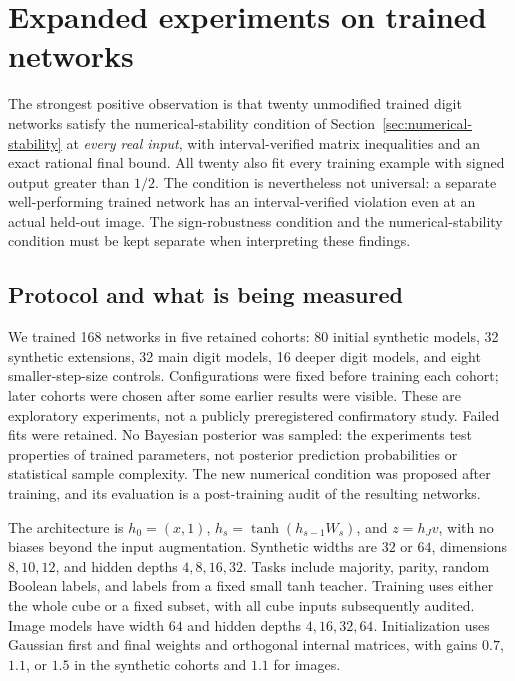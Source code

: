 \section{Expanded experiments on trained networks}
\label{sec:expanded-experiments}

The strongest positive observation is that twenty unmodified trained digit
networks satisfy the numerical-stability condition of Section~\ref{sec:numerical-stability} at \emph{every real
input}, with interval-verified matrix inequalities and an exact rational
final bound. All twenty also fit every training example with signed output
greater than $1/2$. The condition is nevertheless not universal: a separate
well-performing trained network has an interval-verified violation even
at an actual held-out image. The sign-robustness condition and the numerical-stability
condition must be kept separate when interpreting these findings.

\subsection{Protocol and what is being measured}

We trained 168 networks in five retained cohorts: 80 initial synthetic
models, 32 synthetic extensions, 32 main digit models, 16 deeper digit
models, and eight smaller-step-size controls. Configurations were fixed
before training each cohort; later cohorts were chosen after some earlier
results were visible. These are exploratory experiments, not a publicly
preregistered confirmatory study. Failed fits were retained. No Bayesian
posterior was sampled: the experiments test properties of trained
parameters, not posterior prediction probabilities or statistical sample
complexity. The new numerical condition was proposed after training, and
its evaluation is a post-training audit of the resulting networks.

The architecture is $h_0=(x,1)$,
$h_s=\tanh(h_{s-1}W_s)$, and $z=h_Jv$, with no biases beyond the input
augmentation. Synthetic widths are $32$ or $64$, dimensions $8,10,12$,
and hidden depths $4,8,16,32$. Tasks include majority, parity, random
Boolean labels, and labels from a fixed small tanh teacher. Training
uses either the whole cube or a fixed subset, with all cube inputs
subsequently audited. Image models have width $64$ and hidden depths
$4,16,32,64$. Initialization uses Gaussian first and final weights and
orthogonal internal matrices, with gains $0.7$, $1.1$, or $1.5$ in the
synthetic cohorts and $1.1$ for images.

